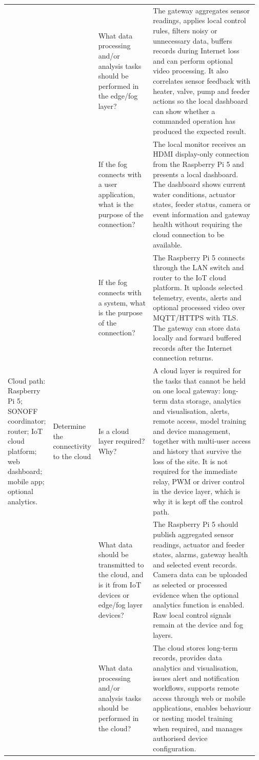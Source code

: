 \begin{longtable}{|P{0.15\linewidth}|P{0.17\linewidth}|P{0.22\linewidth}|P{0.43\linewidth}|}
 &  & What data processing and/or analysis tasks should be performed in the edge/fog layer? & The gateway aggregates sensor readings, applies local control rules, filters noisy or unnecessary data, buffers records during Internet loss and can perform optional video processing. It also correlates sensor feedback with heater, valve, pump and feeder actions so the local dashboard can show whether a commanded operation has produced the expected result.\\
 &  & If the fog connects with a user application, what is the purpose of the connection? & The local monitor receives an HDMI display-only connection from the Raspberry Pi 5 and presents a local dashboard. The dashboard shows current water conditions, actuator states, feeder status, camera or event information and gateway health without requiring the cloud connection to be available.\\
 &  & If the fog connects with a system, what is the purpose of the connection? & The Raspberry Pi 5 connects through the LAN switch and router to the IoT cloud platform. It uploads selected telemetry, events, alerts and optional processed video over MQTT/HTTPS with TLS. The gateway can store data locally and forward buffered records after the Internet connection returns.\\
\hline
Cloud path: Raspberry Pi 5; SONOFF coordinator; router; IoT cloud platform; web dashboard; mobile app; optional analytics. & Determine the connectivity to the cloud & Is a cloud layer required? Why? & A cloud layer is required for the tasks that cannot be held on one local gateway: long-term data storage, analytics and visualisation, alerts, remote access, model training and device management, together with multi-user access and history that survive the loss of the site. It is not required for the immediate relay, PWM or driver control in the device layer, which is why it is kept off the control path.\\
 &  & What data should be transmitted to the cloud, and is it from IoT devices or edge/fog layer devices? & The Raspberry Pi 5 should publish aggregated sensor readings, actuator and feeder states, alarms, gateway health and selected event records. Camera data can be uploaded as selected or processed evidence when the optional analytics function is enabled. Raw local control signals remain at the device and fog layers.\\
 &  & What data processing and/or analysis tasks should be performed in the cloud? & The cloud stores long-term records, provides data analytics and visualisation, issues alert and notification workflows, supports remote access through web or mobile applications, enables behaviour or nesting model training when required, and manages authorised device configuration.\\

\end{longtable}
